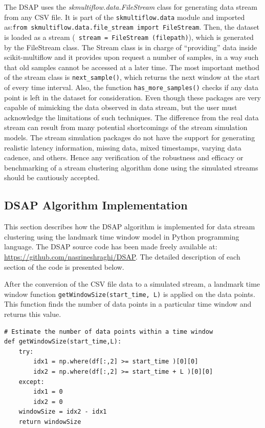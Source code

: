 \documentclass[../UNBThesis2.tex]{subfiles}
\begin{document}
The DSAP uses the \textit{skmultiflow.data.FileStream} class for generating data stream from any CSV file. It is part of the \texttt{skmultiflow.data} module and imported as:\texttt{from skmultiflow.data.file\_stream import FileStream}. Then, the dataset is loaded as a stream (\texttt{ stream = FileStream (filepath)}), which is generated by the FileStream class. The Stream class is in charge of “providing” data inside scikit-multiflow and it provides upon request a number of samples, in a way such that old samples cannot be accessed at a later time. The most important method of the stream class is \texttt{next\_sample()}, which returns the next window at the start of every time interval. Also, the function \texttt{has\_more\_samples()} checks if any data point is left in the dataset for consideration. Even though these packages are very capable of mimicking the data observed in data stream, but the user must acknowledge the limitations of such techniques. The difference from the real data stream can result from many potential shortcomings of the stream simulation models. The stream simulation packages do not have the support for generating realistic latency information, missing data, mixed timestamps, varying data cadence, and others. Hence any verification of the robustness and efficacy or benchmarking of a stream clustering algorithm done using the simulated streams should be cautiously accepted. 


\subsection{DSAP Algorithm Implementation}
This section describes how the DSAP algorithm is implemented for data stream clustering using the landmark time window model in Python programming language. The DSAP source code has been made freely available at: \url{https://github.com/nasrineshraghi/DSAP}. The detailed description of each section of the code is presented below.

After the conversion of the CSV file data to a simulated stream, a landmark time window function \texttt{getWindowSize(start\_time, L)} is applied on the data points. This function finds the number of data points in a particular time window and returns this value. 

\begin{lstlisting}
# Estimate the number of data points within a time window
def getWindowSize(start_time,L):
    try:
        idx1 = np.where(df[:,2] >= start_time )[0][0]
        idx2 = np.where(df[:,2] >= start_time + L )[0][0] 
    except:
        idx1 = 0
        idx2 = 0
    windowSize = idx2 - idx1
    return windowSize
\end{lstlisting}
\end{document}
